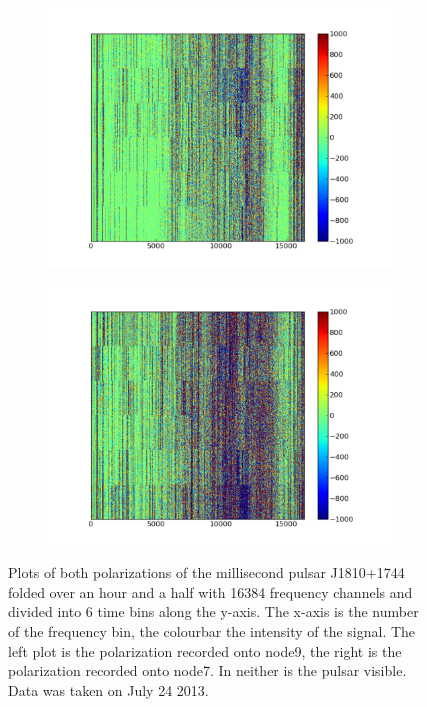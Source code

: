 \documentclass[a4paper,12pt]{article}
\begin{document}
\begin{figure}
\centering
\begin{subfigure}{0.5\textwidth}
  \centering
  \includegraphics[width=1.3\linewidth]{1810fig1node9.pdf}
  \label{fig:sub1810node9}
\end{subfigure}%
\begin{subfigure}{0.5\textwidth}
  \centering
  \includegraphics[width=1.3\linewidth]{1810fig2node7.pdf}
  \label{fig:sub1810node7}
\end{subfigure}
\caption{Plots of both polarizations of the millisecond pulsar J1810+1744 folded over an hour and a half with 16384 frequency channels and divided into 6 time bins along the y-axis. The x-axis is the number of the frequency bin, the colourbar the intensity of the signal. The left plot is the polarization recorded onto node9, the right is the polarization recorded onto node7. In neither is the pulsar visible. Data was taken on July 24 2013.}
\label{fig:folding1810}
\end{figure}
\end{document}
